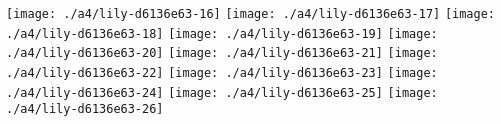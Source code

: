   \linebreak
\else
  \expandafter{}%
\fi
\texttt{[image: ./a4/lily-d6136e63-16]}%
\ifx\betweenLilyPondSystem \undefined
  \linebreak
\else
  \expandafter{}%
\fi
\texttt{[image: ./a4/lily-d6136e63-17]}%
\ifx\betweenLilyPondSystem \undefined
  \linebreak
\else
  \expandafter{}%
\fi
\texttt{[image: ./a4/lily-d6136e63-18]}%
\ifx\betweenLilyPondSystem \undefined
  \linebreak
\else
  \expandafter{}%
\fi
\texttt{[image: ./a4/lily-d6136e63-19]}%
\ifx\betweenLilyPondSystem \undefined
  \linebreak
\else
  \expandafter{}%
\fi
\texttt{[image: ./a4/lily-d6136e63-20]}%
\ifx\betweenLilyPondSystem \undefined
  \linebreak
\else
  \expandafter{}%
\fi
\texttt{[image: ./a4/lily-d6136e63-21]}%
\ifx\betweenLilyPondSystem \undefined
  \linebreak
\else
  \expandafter{}%
\fi
\texttt{[image: ./a4/lily-d6136e63-22]}%
\ifx\betweenLilyPondSystem \undefined
  \linebreak
\else
  \expandafter{}%
\fi
\texttt{[image: ./a4/lily-d6136e63-23]}%
\ifx\betweenLilyPondSystem \undefined
  \linebreak
\else
  \expandafter{}%
\fi
\texttt{[image: ./a4/lily-d6136e63-24]}%
\ifx\betweenLilyPondSystem \undefined
  \linebreak
\else
  \expandafter{}%
\fi
\texttt{[image: ./a4/lily-d6136e63-25]}%
\ifx\betweenLilyPondSystem \undefined
  \linebreak
\else
  \expandafter{}%
\fi
\texttt{[image: ./a4/lily-d6136e63-26]}%
